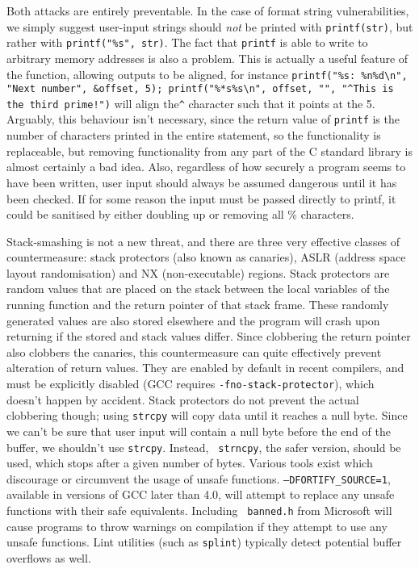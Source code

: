 Both attacks are entirely preventable. In the case of format string vulnerabilities, we simply suggest user-input
strings should \emph{not} be printed with {\tt printf(str)}, but rather with {\tt printf("\%s", str)}. The fact that
{\tt printf} is able to write to arbitrary memory addresses is also a problem. This is actually a useful feature of the
function, allowing outputs to be aligned, for instance {\tt printf("\%s: \%n\%d\textbackslash n", "Next number",
\&offset, 5); printf("\%*s\%s\textbackslash n", offset, "", "\textasciicircum This is the third prime!")} will align
the{\tt \textasciicircum} character such that it points at the 5. Arguably, this behaviour isn't necessary, since the
return value of {\tt printf} is the number of characters printed in the entire statement, so the functionality is
replaceable, but removing functionality from any part of the C standard library is almost certainly a bad idea. Also,
regardless of how securely a program seems to have been written, user input should always be assumed dangerous until it
has been checked. If for some reason the input must be passed directly to printf, it could be sanitised by either
doubling up or removing all \% characters.

Stack-smashing is not a new threat, and there are three very effective classes of countermeasure: stack protectors (also
known as canaries), ASLR (address space layout randomisation) and NX (non-executable) regions. Stack protectors are
random values that are placed on the stack between the local variables of the running function and the return pointer of
that stack frame. These randomly generated values are also stored elsewhere and the program will crash upon returning if
the stored and stack values differ. Since clobbering the return pointer also clobbers the canaries, this countermeasure
can quite effectively prevent alteration of return values. They are enabled by default in recent compilers, and must be
explicitly disabled (GCC requires {\tt -fno-stack-protector}), which doesn't happen by accident. Stack protectors do not
prevent the actual clobbering though; using {\tt strcpy} will copy data until it reaches a null byte. Since we can't be
sure that user input will contain a null byte before the end of the buffer, we shouldn't use {\tt strcpy}. Instead, {\tt
strncpy}, the safer version, should be used, which stops after a given number of bytes. Various tools exist which
discourage or circumvent the usage of unsafe functions. {\tt --DFORTIFY\_SOURCE=1}\cite{fort_source}, available in
versions of GCC later than 4.0, will attempt to replace any unsafe functions with their safe equivalents. Including {\tt
banned.h} from Microsoft\cite{banned} will cause programs to throw warnings on compilation if they attempt to use any
unsafe functions. Lint utilities (such as {\tt splint}) typically detect potential buffer overflows as well.

